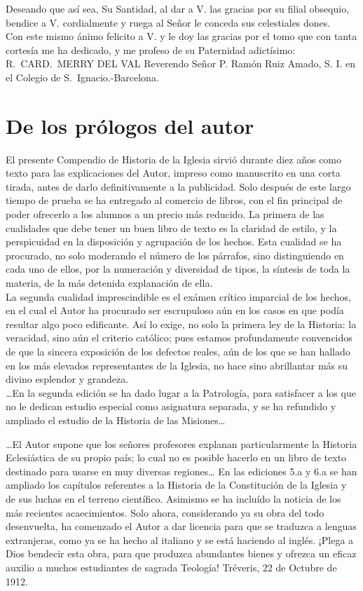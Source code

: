 \raggedbottom{} \documentclass[12pt, a4paper]{book}
\begin{document}
Deseando que así sea, Su Santidad, al dar a V. las gracias por su filial obsequio, bendice a V. cordialmente y ruega al Señor le conceda sus celestiales dones.\\
Con este mismo ánimo felicito a V. y le doy las gracias por el tomo que con tanta cortesía me ha dedicado, y me profeso de su Paternidad adictísimo:\\
R.\ CARD.\ MERRY DEL VAL
Reverendo Señor P. Ramón Ruiz Amado, S. I. en el Colegio de S.\ Ignacio.\@ -Barcelona.
\section{De los prólogos del autor}
El presente Compendio de Historia de la Iglesia sirvió durante diez años como texto para las explicaciones del Autor, impreso como manuscrito en una corta tirada, antes de darlo definitivamente a la publicidad. Solo después de este largo tiempo de prueba se ha entregado al comercio de libros, con el fin principal de poder ofrecerlo a los alumnos a un precio más reducido. La primera de las cualidades que debe tener un buen libro de texto es la claridad de estilo, y la perspicuidad en la disposición y agrupación de los hechos. Esta cualidad se ha procurado, no solo moderando el número de los párrafos, sino distinguiendo en cada uno de ellos, por la numeración y diversidad de tipos, la síntesis de toda la materia, de la más detenida explanación de ella.\\
La segunda cualidad imprescindible es el exámen crítico imparcial de los hechos, en el cual el Autor ha procurado ser escrupuloso aún en los casos en que podía resultar algo poco edificante. Así lo exige, no solo la primera ley de la Historia: la veracidad, sino aún el criterio católico; pues estamos profundamente convencidos de que la sincera exposición de los defectos reales, aún de los que se han hallado en los más elevados representantes de la Iglesia, no hace sino abrillantar más su divino esplendor y grandeza.\\
\ldots En la segunda edición se ha dado lugar a la Patrología, para satisfacer a los que no le dedican estudio especial como asignatura separada, y se ha refundido y ampliado el estudio de la Historia de las Misiones\ldots

\ldots El Autor supone que los señores profesores explanan particularmente la Historia Eclesiástica de su propio país; lo cual no es posible hacerlo en un libro de texto destinado para usarse en muy diversas regiones\ldots
En las ediciones 5.a y 6.a se han ampliado los capítulos referentes a la Historia de la Constitución de la Iglesia y de sus luchas en el terreno científico. Asimismo se ha incluído la noticia de los más recientes acaecimientos.
Solo ahora, considerando ya su obra del todo desenvuelta, ha comenzado el Autor a dar licencia para que se traduzca a lenguas extranjeras, como ya se ha hecho al italiano y se está haciendo al inglés. ¡Plega a Dios bendecir esta obra, para que produzca abundantes bienes y ofrezca un eficaz auxilio a muchos estudiantes de sagrada Teología!
Tréveris, 22 de Octubre de 1912.
\end{document}
